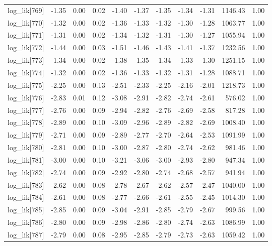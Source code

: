 \begin{table}[ht]
\begin{tabular}{rrrrrrrrrrr}
  log\_lik[769] & -1.35 & 0.00 & 0.02 & -1.40 & -1.37 & -1.35 & -1.34 & -1.31 & 1146.43 & 1.00 \\ 
  log\_lik[770] & -1.32 & 0.00 & 0.02 & -1.36 & -1.33 & -1.32 & -1.30 & -1.28 & 1063.77 & 1.00 \\ 
  log\_lik[771] & -1.31 & 0.00 & 0.02 & -1.34 & -1.32 & -1.31 & -1.30 & -1.27 & 1055.94 & 1.00 \\ 
  log\_lik[772] & -1.44 & 0.00 & 0.03 & -1.51 & -1.46 & -1.43 & -1.41 & -1.37 & 1232.56 & 1.00 \\ 
  log\_lik[773] & -1.34 & 0.00 & 0.02 & -1.38 & -1.35 & -1.34 & -1.33 & -1.30 & 1251.15 & 1.00 \\ 
  log\_lik[774] & -1.32 & 0.00 & 0.02 & -1.36 & -1.33 & -1.32 & -1.31 & -1.28 & 1088.71 & 1.00 \\ 
  log\_lik[775] & -2.25 & 0.00 & 0.13 & -2.51 & -2.33 & -2.25 & -2.16 & -2.01 & 1218.73 & 1.00 \\ 
  log\_lik[776] & -2.83 & 0.01 & 0.12 & -3.08 & -2.91 & -2.82 & -2.74 & -2.61 & 576.02 & 1.00 \\ 
  log\_lik[777] & -2.76 & 0.00 & 0.09 & -2.94 & -2.82 & -2.76 & -2.69 & -2.58 & 817.28 & 1.00 \\ 
  log\_lik[778] & -2.89 & 0.00 & 0.10 & -3.09 & -2.96 & -2.89 & -2.82 & -2.69 & 1008.40 & 1.00 \\ 
  log\_lik[779] & -2.71 & 0.00 & 0.09 & -2.89 & -2.77 & -2.70 & -2.64 & -2.53 & 1091.99 & 1.00 \\ 
  log\_lik[780] & -2.81 & 0.00 & 0.10 & -3.00 & -2.87 & -2.80 & -2.74 & -2.62 & 981.46 & 1.00 \\ 
  log\_lik[781] & -3.00 & 0.00 & 0.10 & -3.21 & -3.06 & -3.00 & -2.93 & -2.80 & 947.34 & 1.00 \\ 
  log\_lik[782] & -2.74 & 0.00 & 0.09 & -2.92 & -2.80 & -2.74 & -2.68 & -2.57 & 941.94 & 1.00 \\ 
  log\_lik[783] & -2.62 & 0.00 & 0.08 & -2.78 & -2.67 & -2.62 & -2.57 & -2.47 & 1040.00 & 1.00 \\ 
  log\_lik[784] & -2.61 & 0.00 & 0.08 & -2.77 & -2.66 & -2.61 & -2.55 & -2.45 & 1014.30 & 1.00 \\ 
  log\_lik[785] & -2.85 & 0.00 & 0.09 & -3.04 & -2.91 & -2.85 & -2.79 & -2.67 & 999.56 & 1.00 \\ 
  log\_lik[786] & -2.80 & 0.00 & 0.09 & -2.98 & -2.86 & -2.80 & -2.74 & -2.63 & 1086.99 & 1.00 \\ 
  log\_lik[787] & -2.79 & 0.00 & 0.08 & -2.95 & -2.85 & -2.79 & -2.73 & -2.63 & 1059.42 & 1.00 \\ 

\end{tabular}
\end{table}
